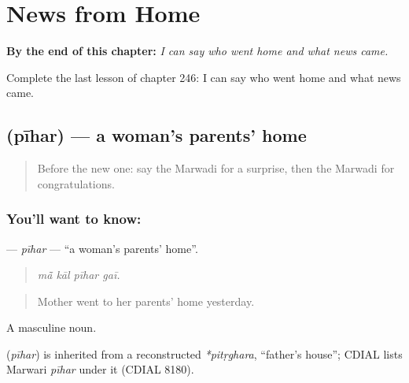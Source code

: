 
\chapter{News from Home}
\label{ch:mw-news-from-home}

\begin{chapteropening}
\textbf{By the end of this chapter:} \emph{I can say who went home and what news came.}

Complete the last lesson of chapter 246: I can say who went home and what news came.
\end{chapteropening}

\section[\texorpdfstring{\mw{पीहर} (pīhar)}{पीहर (pīhar)}]{ (pīhar) — a woman's parents' home}

\label{lesson:MW-C246-pihar}



\begin{quote}
Before the new one: say the Marwadi for a surprise, then the Marwadi for congratulations.
\end{quote}

\subsection*{You'll want to know: }
\textbf{} — \emph{pīhar} — \textquotedblleft{}a woman's parents' home\textquotedblright{}.

\begin{quote}
   
\end{quote}

\begin{quote}
\emph{mā̃ kāl pīhar gaī.}
\end{quote}

\begin{quote}
Mother went to her parents' home yesterday.
\end{quote}

A masculine noun.

\begin{cousinweb}
\textbf{} (\emph{pīhar}) is inherited from a reconstructed \emph{*pitṛghara}, \textquotedblleft{}father's house\textquotedblright{}; CDIAL lists Marwari \emph{pīhar} under it (CDIAL 8180).
\end{cousinweb}

